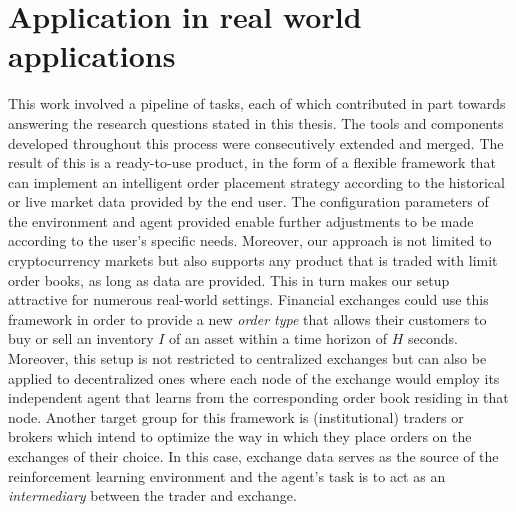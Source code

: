 \section{Application in real world applications}

This work involved a pipeline of tasks, each of which contributed in part towards answering the research questions stated in this thesis.
The tools and components developed throughout this process were consecutively extended and merged.
The result of this is a ready-to-use product, in the form of a flexible framework that can implement an intelligent order placement strategy according to the historical or live market data provided by the end user.
The configuration parameters of the environment and agent provided enable further adjustments to be made according to the user's specific needs.
Moreover, our approach is not limited to cryptocurrency markets but also supports any product that is traded with limit order books, as long as data are provided.
This in turn makes our setup attractive for numerous real-world settings.
Financial exchanges could use this framework in order to provide a new \textit{order type} that allows their customers to buy or sell an inventory $I$ of an asset within a time horizon of $H$ seconds.
Moreover, this setup is not restricted to centralized exchanges but can also be applied to decentralized ones where each node of the exchange would employ its independent agent that learns from the corresponding order book residing in that node.
Another target group for this framework is (institutional) traders or brokers which intend to optimize the way in which they place orders on the exchanges of their choice.
In this case, exchange data serves as the source of the reinforcement learning environment and the agent's task is to act as an \textit{intermediary} between the trader and exchange.
